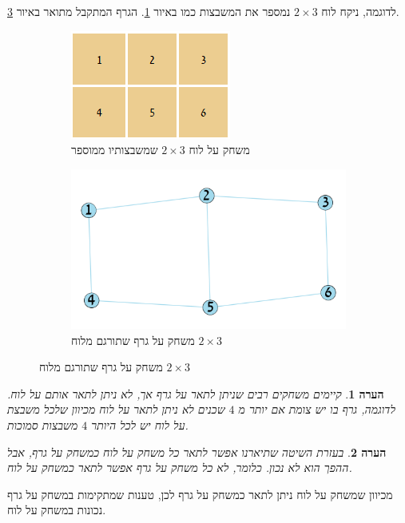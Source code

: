 \documentclass[12pt,leqno]{article}
\theoremstyle{theoremdd}
\newtheorem{comm}{הערה}
\begin{document}
לדוגמה, ניקח לוח
$2 \times 3$
נמספר את המשבצות כמו באיור
\ref{2x3_board}.
הגרף המתקבל מתואר באיור
\ref{2x3_graph}.

\begin{figure}[ht]
    \caption{
        דוגמה
        למשחק על לוח שתורגם למשחק על גרף
        }
    \begin{subfigure}{.5\textwidth}
        \caption{
            משחק על לוח
            $2 \times 3$
            שמשבצותיו
            ממוספר
        }
        \label{2x3_board}
        \centering
        \includegraphics[scale=.95]{images/2x3_board.PNG}
    \end{subfigure}%
    \begin{subfigure}{.5\textwidth}
        \caption{
            משחק על גרף
            שתורגם מלוח
            $2 \times 3$
        }
        \centering
        \label{2x3_graph}
        \includegraphics[scale=0.8]{images/2x3_graph.png}
    \end{subfigure}%
\end{figure}

\begin{comm}
קיימים משחקים רבים שניתן לתאר על גרף אך, לא ניתן לתאר אותם על לוח.
לדוגמה, גרף בו יש צומת אם יותר מ
$4$
שכנים לא ניתן לתאר על לוח מכיוון
שלכל
משבצת על לוח
יש לכל היותר
$4$
משבצות סמוכות.
\end{comm}
\begin{comm}
    בעזרת השיטה שתיארנו אפשר לתאר כל משחק על לוח כמשחק על גרף, אבל ההפך הוא לא נכון.
כלומר, לא כל משחק על גרף אפשר לתאר כמשחק על לוח.
\end{comm}
מכיוון שמשחק על לוח ניתן לתאר כמשחק על גרף לכן, טענות שמתקימות
במשחק על גרף נכונות במשחק על לוח.
\end{document}
